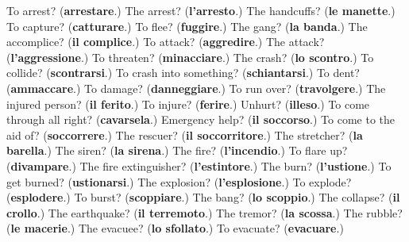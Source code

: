 \begin{tcolorbox}[breakable,colback=teal!4,colframe=teal!35!black,title={Before you move on}]
To arrest? (\textbf{arrestare}.) The arrest? (\textbf{l'arresto}.) The handcuffs? (\textbf{le manette}.) To capture? (\textbf{catturare}.) To flee? (\textbf{fuggire}.) The gang? (\textbf{la banda}.) The accomplice? (\textbf{il complice}.) To attack? (\textbf{aggredire}.) The attack? (\textbf{l'aggressione}.) To threaten? (\textbf{minacciare}.) The crash? (\textbf{lo scontro}.) To collide? (\textbf{scontrarsi}.) To crash into something? (\textbf{schiantarsi}.) To dent? (\textbf{ammaccare}.) To damage? (\textbf{danneggiare}.) To run over? (\textbf{travolgere}.) The injured person? (\textbf{il ferito}.) To injure? (\textbf{ferire}.) Unhurt? (\textbf{illeso}.) To come through all right? (\textbf{cavarsela}.) Emergency help? (\textbf{il soccorso}.) To come to the aid of? (\textbf{soccorrere}.) The rescuer? (\textbf{il soccorritore}.) The stretcher? (\textbf{la barella}.) The siren? (\textbf{la sirena}.) The fire? (\textbf{l'incendio}.) To flare up? (\textbf{divampare}.) The fire extinguisher? (\textbf{l'estintore}.) The burn? (\textbf{l'ustione}.) To get burned? (\textbf{ustionarsi}.) The explosion? (\textbf{l'esplosione}.) To explode? (\textbf{esplodere}.) To burst? (\textbf{scoppiare}.) The bang? (\textbf{lo scoppio}.) The collapse? (\textbf{il crollo}.) The earthquake? (\textbf{il terremoto}.) The tremor? (\textbf{la scossa}.) The rubble? (\textbf{le macerie}.) The evacuee? (\textbf{lo sfollato}.) To evacuate? (\textbf{evacuare}.)
\end{tcolorbox}
